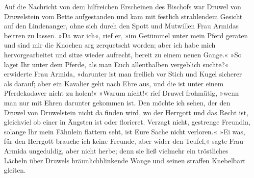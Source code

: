 \pagenum{[45]} Auf die Nachricht von dem hilfreichen Erscheinen des
Bischofs war Druwel von Druwelstein vom Bette aufgestanden und kam
mit festlich strahlendem Gesicht auf den Lindenanger, ohne sich
durch den Spott und Mutwillen Frau Armidas beirren zu lassen. »Da
war ich«, rief er, »im Getümmel unter mein Pferd geraten und sind
mir die Knochen arg zerquetscht worden; aber ich habe mich
hervorgearbeitet und sitze wieder aufrecht, bereit zu einem neuen
Gange.« »So laget Ihr unter dem Pferde, als man Euch allenthalben
vergeblich suchte?« erwiderte Frau Armida, »darunter ist man
freilich vor Stich und Kugel sicherer als darauf; aber ein Kavalier
geht nach Ehre aus, und die ist unter einem Pferdekadaver nicht zu
holen!« »Warum nicht!« rief Druwel frohmütig, »wenn man nur mit
Ehren darunter gekommen ist. Den möchte ich sehen, der den Druwel
von Druwelstein nicht da finden wird, wo der Herrgott und das Recht
ist, gleichviel ob einer in Ängsten ist oder florieret. Verzagt
nicht, gestrenge Freundin, solange Ihr mein Fähnlein flattern seht,
ist Eure Sache nicht verloren.« »Ei was, für den Herrgott brauche
ich keine Freunde, aber wider den Teufel,« sagte Frau Armida
ungeduldig, aber nicht herbe; denn sie ließ vielmehr ein
tröstliches Lächeln über Druwels bräunlichblinkende Wange und
seinen straffen Knebelbart gleiten.

